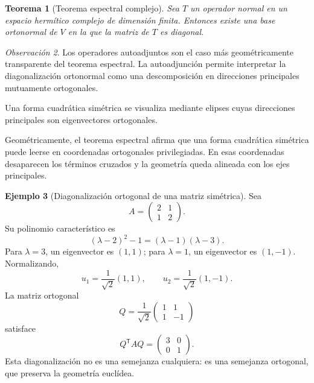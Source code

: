 \documentclass[10pt,a4paper,oneside]{article}
\theoremstyle{plain}
\newtheorem{theorem}{Teorema}[section]
\theoremstyle{definition}
\newtheorem{example}[theorem]{Ejemplo}
\theoremstyle{remark}
\newtheorem{remark}[theorem]{Observación}
\newcommand{\transpose}{^{\mathsf{T}}}
\begin{document}
\begin{theorem}[Teorema espectral complejo]
Sea \(T\) un operador normal en un espacio hermítico complejo de dimensión finita. Entonces existe una base ortonormal de \(V\) en la que la matriz de \(T\) es diagonal.
\end{theorem}

\begin{remark}
Los operadores autoadjuntos son el caso más geométricamente transparente del teorema espectral. La autoadjunción permite interpretar la diagonalización ortonormal como una descomposición en direcciones principales mutuamente ortogonales.
\end{remark}

\begin{center}

{\small Una forma cuadrática simétrica se visualiza mediante elipses cuyas direcciones principales son eigenvectores ortogonales.}
\end{center}

\begin{intuitionBox}
Geométricamente, el teorema espectral afirma que una forma cuadrática simétrica puede leerse en coordenadas ortogonales privilegiadas. En esas coordenadas desaparecen los términos cruzados y la geometría queda alineada con los ejes principales.
\end{intuitionBox}

\begin{example}[Diagonalización ortogonal de una matriz simétrica]
Sea
\[
A=
\begin{pmatrix}
2 & 1\\
1 & 2
\end{pmatrix}.
\]
Su polinomio característico es
\[
(\lambda-2)^2-1=(\lambda-1)(\lambda-3).
\]
Para \(\lambda=3\), un eigenvector es \((1,1)\); para \(\lambda=1\), un eigenvector es \((1,-1)\). Normalizando,
\[
u_1=\frac{1}{\sqrt2}(1,1),
\qquad
u_2=\frac{1}{\sqrt2}(1,-1).
\]
La matriz ortogonal
\[
Q=
\frac{1}{\sqrt2}
\begin{pmatrix}
1 & 1\\
1 & -1
\end{pmatrix}
\]
satisface
\[
Q\transpose AQ=
\begin{pmatrix}
3 & 0\\
0 & 1
\end{pmatrix}.
\]
Esta diagonalización no es una semejanza cualquiera: es una semejanza ortogonal, que preserva la geometría euclídea.
\end{example}
\end{document}
